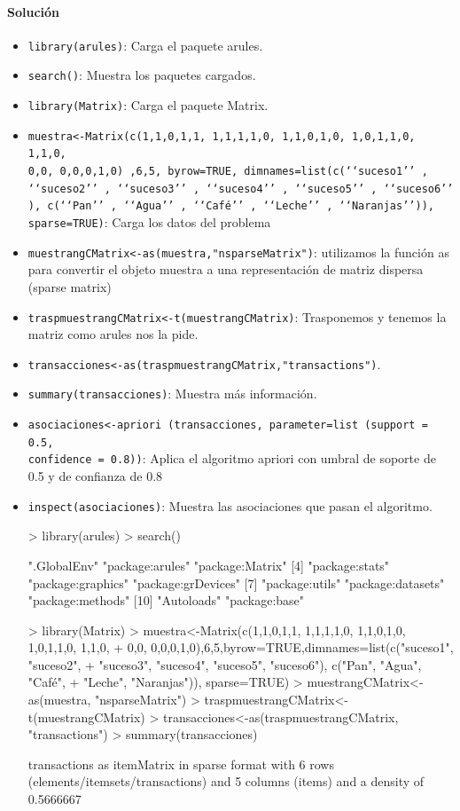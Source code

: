 \documentclass[a4paper, 12pt]{article}
\begin{document}
	\paragraph{Solución}
	\begin{itemize}
		\item \texttt{library(arules)}: Carga el paquete arules.
		\item \texttt{search()}: Muestra los paquetes cargados.
		\item \texttt{library(Matrix)}: Carga el paquete Matrix.
		\item \texttt{muestra<-Matrix(c(1,1,0,1,1, 1,1,1,1,0, 1,1,0,1,0, 1,0,1,1,0, 1,1,0,\\0,0, 0,0,0,1,0) ,6,5, byrow=TRUE, dimnames=list(c(‘‘suceso1’’ , ‘‘suceso2’’ , ‘‘suceso3’’ , ‘‘suceso4’’ , ‘‘suceso5’’ , ‘‘suceso6’’ ), c(‘‘Pan’’ , ‘‘Agua’’ , ‘‘Café’’ , ‘‘Leche’’ , ‘‘Naranjas’’)), sparse=TRUE)}: Carga los datos del problema
		\item \texttt{muestrangCMatrix<-as(muestra,"nsparseMatrix")}: utilizamos la función as para convertir el objeto muestra a una representación de matriz dispersa (sparse matrix)
		\item \texttt{traspmuestrangCMatrix<-t(muestrangCMatrix)}: Trasponemos y tenemos la matriz como arules nos la pide.
		\item \texttt{transacciones<-as(traspmuestrangCMatrix,"transactions")}.
		\item \texttt{summary(transacciones)}: Muestra más información.
		\item \texttt{asociaciones<-apriori (transacciones, parameter=list (support = 0.5, \\confidence = 0.8))}: Aplica el algoritmo apriori con umbral de soporte de 0.5 y de confianza de 0.8
		\item \texttt{inspect(asociaciones)}: Muestra las asociaciones que pasan el algoritmo.
\begin{Schunk}
\begin{Sinput}
> library(arules)
> search()
\end{Sinput}
\begin{Soutput}
 [1] ".GlobalEnv"        "package:arules"    "package:Matrix"   
 [4] "package:stats"     "package:graphics"  "package:grDevices"
 [7] "package:utils"     "package:datasets"  "package:methods"  
[10] "Autoloads"         "package:base"     
\end{Soutput}
\begin{Sinput}
> library(Matrix)
> muestra<-Matrix(c(1,1,0,1,1, 1,1,1,1,0, 1,1,0,1,0, 1,0,1,1,0, 1,1,0,
+ 0,0, 0,0,0,1,0),6,5,byrow=TRUE,dimnames=list(c("suceso1", "suceso2",
+ "suceso3", "suceso4", "suceso5", "suceso6"), c("Pan", "Agua", "Café",
+ "Leche", "Naranjas")), sparse=TRUE)
> muestrangCMatrix<-as(muestra, "nsparseMatrix")
> traspmuestrangCMatrix<-t(muestrangCMatrix)
> transacciones<-as(traspmuestrangCMatrix, "transactions")
> summary(transacciones)
\end{Sinput}
\begin{Soutput}
transactions as itemMatrix in sparse format with
 6 rows (elements/itemsets/transactions) and
 5 columns (items) and a density of 0.5666667 


\end{Soutput}
\end{Schunk}
\end{itemize}
\end{document}
